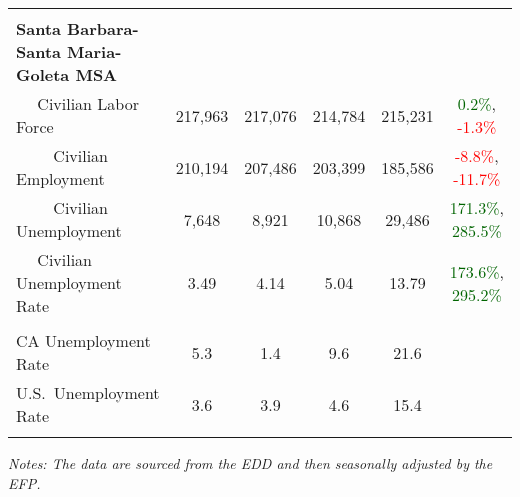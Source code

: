 \documentclass[12pt]{article}
\begin{document}
\begin{landscape}
\begin{table}
\begin{tabular}{|l|c|c|c|c|c|}
&&&&& \\
\textbf{Santa Barbara-Santa Maria-Goleta MSA} &&&&& \\
$\quad$ Civilian Labor Force &217,963 & 217,076 & 214,784 & 215,231 & \textcolor{darkgreen}{0.2\%}, \textcolor{red}{-1.3\%} \\
$\qquad$ \small Civilian Employment &210,194 & 207,486 & 203,399 & 185,586 & \textcolor{red}{-8.8\%}, \textcolor{red}{-11.7\%} \\
$\qquad$ \small Civilian Unemployment &7,648 & 8,921 & 10,868 & 29,486 & \textcolor{darkgreen}{171.3\%}, \textcolor{darkgreen}{285.5\%} \\
$\quad$ Civilian Unemployment Rate &3.49 & 4.14 & 5.04 & 13.79 & \textcolor{darkgreen}{173.6\%}, \textcolor{darkgreen}{295.2\%} \\
&&&&& \\
CA Unemployment Rate & 5.3 & 1.4 & 9.6 & 21.6 & \\
U.S.\ Unemployment Rate & 3.6 & 3.9 & 4.6 & 15.4 & \\
& & & & & \\ \hline \hline
\end{tabular}
\par
\vspace{.5em}
\footnotesize
\textit{Notes: The data are sourced from the EDD and then seasonally adjusted by the EFP.}
\end{table}
\end{landscape}
\end{document}

